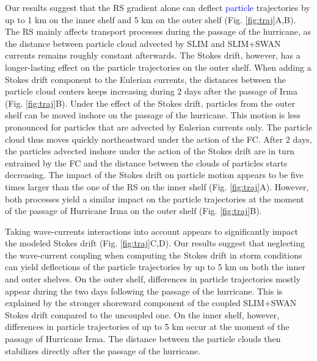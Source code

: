\documentclass[preprint,12pt,authoryear]{elsarticle}
\newcommand{\modif}[1]{\textcolor{blue}{#1}}
\begin{document}
Our results suggest that the RS gradient alone can deflect \modif{particle} trajectories by up to 1 km on the inner shelf and 5 km on the outer shelf (Fig. \ref{fig:traj}A,B). The RS mainly affects transport processes during the passage of the hurricane, as the distance between particle cloud advected by SLIM and SLIM+SWAN currents remains roughly constant afterwards. The Stokes drift, however, has a longer-lasting effect on the particle trajectories on the outer shelf. When adding a Stokes drift component to the Eulerian currents, the distances between the particle cloud centers keeps increasing during 2 days after the passage of Irma (Fig. \ref{fig:traj}B). Under the effect of the Stokes drift, particles from the outer shelf can be moved inshore on the passage of the hurricane. This motion is less pronounced for particles that are advected by Eulerian currents only. The particle cloud thus moves quickly northeastward under the action of the FC. After 2 days, the particles advected inshore under the action of the Stokes drift are in turn entrained by the FC and the distance between the clouds of particles starts decreasing. The impact of the Stokes drift on particle motion appears to be five times larger than the one of the RS on the inner shelf (Fig. \ref{fig:traj}A). However, both processes yield a similar impact on the particle trajectories at the moment of the passage of Hurricane Irma on the outer shelf (Fig. \ref{fig:traj}B).

Taking wave-currents interactions into account appears to significantly impact the modeled Stokes drift (Fig. \ref{fig:traj}C,D). Our results suggest that neglecting the wave-current coupling when computing the Stokes drift in storm conditions can yield deflections of the particle trajectories by up to 5 km on both the inner and outer shelves. On the outer shelf, differences in particle trajectories mostly appear during the two days following the passage of the hurricane. This is explained by the stronger shoreward component of the coupled SLIM+SWAN Stokes drift compared to the uncoupled one. On the inner shelf, however, differences in particle trajectories of up to 5 km occur at the moment of the passage of Hurricane Irma. The distance between the particle clouds then stabilizes directly after the passage of the hurricane.

\end{document}
